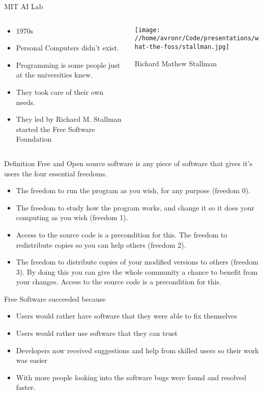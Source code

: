 \documentclass[presentation]{beamer}
\begin{document}
\begin{frame}[label={sec:org9bc6414}]{MIT AI Lab}
\begin{columns}
\begin{column}{0.6\columnwidth}
\begin{itemize}
\item 1970s
\item Personal Computers didn't exist.
\item Programming is some people just at the universities knew.
\item They took care of their own needs.
\item They led by Richard M. Stallman started the Free Software Foundation
\end{itemize}
\end{column}
\begin{column}{0.4\columnwidth}
\begin{center}
\texttt{[image: //home/avronr/Code/presentations/what-the-foss/stallman.jpg]}
\end{center}
Richard Mathew Stallman
\end{column}
\end{columns}
\end{frame}
\begin{frame}[label={sec:org9566b29}]{Definition}
Free and Open source software is any piece of software that gives it's users the four essential freedoms.
\begin{itemize}
\item The freedom to run the program as you wish, for any purpose (freedom 0).
\item The freedom to study how the program works, and change it so it does your computing as you wish (freedom 1).
\item Access to the source code is a precondition for this. The freedom to redistribute copies so you can help others (freedom 2).
\item The freedom to distribute copies of your modified versions to others (freedom 3). By doing this you can give the whole community a chance to benefit from your changes. Access to the source code is a precondition for this.
\end{itemize}
\end{frame}
\begin{frame}[label={sec:orgdc3b4dd}]{Free Software succeeded because}
\begin{itemize}
\item Users would rather have software that they were able to fix themselves
\item Users would rather use software that they can trust
\item Developers now received suggestions and help from skilled users so their work was easier
\item With more people looking into the software bugs were found and resolved faster.
\end{itemize}
\end{frame}
\end{document}
